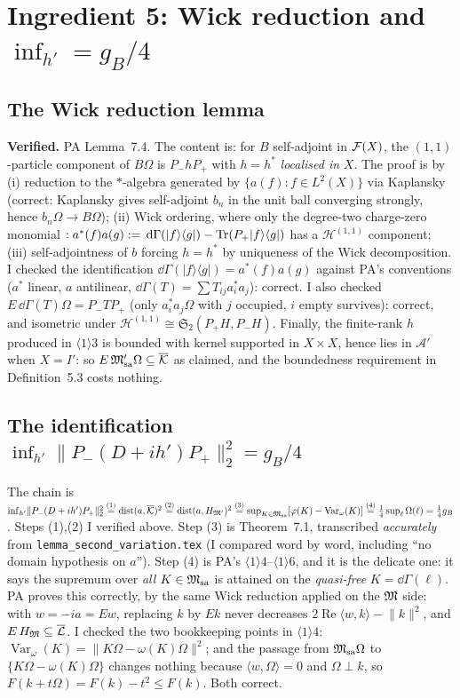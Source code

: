 \documentclass[11pt]{article}
\newcommand{\Pp}{P_+}\newcommand{\Pm}{P_-}
\providecommand{\Om}{\Omega}\providecommand{\Gm}{\Gamma}\providecommand{\Qt}{\widetilde Q}
\providecommand{\Msa}{\cM_{\mathrm{sa}}}\providecommand{\Mpsa}{\cM'_{\mathrm{sa}}}
\providecommand{\dist}{\operatorname{dist}}\providecommand{\Var}{\operatorname{Var}}
\providecommand{\Stwo}{\mathfrak S_2}\providecommand{\Sone}{\mathfrak S_1}
\providecommand{\norm}[1]{\lVert #1\rVert}\providecommand{\abs}[1]{\lvert #1\rvert}
\providecommand{\ip}[2]{\langle #1,#2\rangle}\providecommand{\one}{\mathbf 1}
\providecommand{\ket}[1]{|#1\rangle}\providecommand{\bra}[1]{\langle #1|}
\begin{document}
\section{Ingredient 5: Wick reduction and $\inf_{h'}=g_B/4$}\label{sec:i5}

\subsection{The Wick reduction lemma}
\textbf{Verified.}  PA Lemma~7.4.  The content is: for $B$ self-adjoint in $\mathcal F(X)$, the
$(1,1)$-particle component of $B\Om$ is $\Pm h\Pp$ with $h=h^*$ \emph{localised in} $X$.  The proof
is by (i) reduction to the $*$-algebra generated by $\{a(f):f\in L^2(X)\}$ via Kaplansky (correct:
Kaplansky gives self-adjoint $b_n$ in the unit ball converging strongly, hence $b_n\Om\to B\Om$);
(ii) Wick ordering, where only the degree-two charge-zero monomial
$:a^*(f)a(g):=\dd\Gm(\ket f\bra g)-\Tr(\Pp\ket f\bra g)$ has a $\mathcal H^{(1,1)}$ component;
(iii) self-adjointness of $b$ forcing $h=h^*$ by uniqueness of the Wick decomposition.
I checked the identification $\dd\Gm(\ket f\bra g)=a^*(f)a(g)$ against PA's conventions
($a^*$ linear, $a$ antilinear, $\dd\Gm(T)=\sum T_{ij}a_i^*a_j$): correct.  I also checked
$E\,\dd\Gm(T)\Om=\Pm T\Pp$ (only $a_i^*a_j\Om$ with $j$ occupied, $i$ empty survives): correct, and
isometric under $\mathcal H^{(1,1)}\cong\Stwo(\Pp H,\Pm H)$.
Finally, the finite-rank $h$ produced in $\langle1\rangle3$ is bounded with kernel supported in
$X\times X$, hence lies in $\mathcal A'$ when $X=I'$: so $E\,\cM'_{\rm sa}\Om\subseteq
\overline{\mathcal K}$ as claimed, and the boundedness requirement in Definition~5.3 costs nothing.

\subsection{The identification $\inf_{h'}\norm{\Pm(D+ih')\Pp}_2^2=g_B/4$}
The chain is
$\inf_{h'}\norm{\Pm(D+ih')\Pp}_2^2
 \overset{(1)}=\dist(a,\overline{\mathcal K})^2
 \overset{(2)}=\dist(a,H_{\cM'})^2
 \overset{(3)}=\sup_{K\in\Msa}[\varphi(K)-\Var_\omega(K)]
 \overset{(4)}=\tfrac14\sup_\ell\Omega(\ell)=\tfrac14g_B$.
Steps (1),(2) I verified above.  Step (3) is Theorem~7.1, transcribed \emph{accurately} from
\texttt{lemma\_second\_variation.tex} (I compared word by word, including ``no domain hypothesis on
$a$'').  Step (4) is PA's $\langle1\rangle4$--$\langle1\rangle6$, and it is the delicate one: it says
the supremum over \emph{all} $K\in\Msa$ is attained on the \emph{quasi-free} $K=\dd\Gm(\ell)$.
PA proves this correctly, by the same Wick reduction applied on the $\mathfrak M$ side: with $w=-ia=Ew$,
replacing $k$ by $Ek$ never decreases $2\operatorname{Re}\ip wk-\norm k^2$, and
$E\,H_\mathfrak M\subseteq\overline{\mathcal L}$.  I checked the two bookkeeping points in
$\langle1\rangle4$: $\Var_\omega(K)=\norm{K\Om-\omega(K)\Om}^2$; and the passage from $\Msa\Om$ to
$\{K\Om-\omega(K)\Om\}$ changes nothing because $\ip w\Om=0$ and $\Om\perp k$, so
$F(k+t\Om)=F(k)-t^2\le F(k)$.  Both correct.
\end{document}
